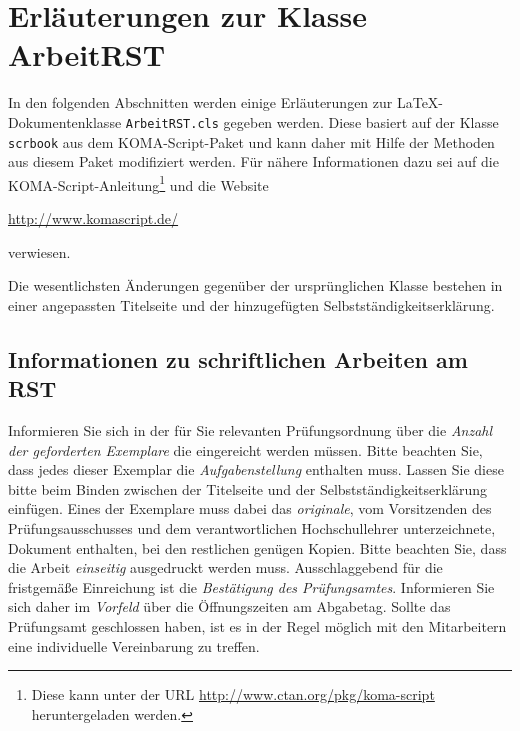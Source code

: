 \chapter{Erläuterungen zur Klasse ArbeitRST}
In den folgenden Abschnitten werden einige Erläuterungen zur \LaTeX-Dokumentenklasse \texttt{ArbeitRST.cls} gegeben werden. Diese basiert auf der Klasse \texttt{scrbook} aus dem KOMA-Script-Paket und kann daher mit Hilfe der Methoden aus diesem Paket modifiziert werden. Für nähere Informationen dazu sei auf die KOMA-Script-Anleitung\footnote{Diese kann unter der URL \url{http://www.ctan.org/pkg/koma-script} heruntergeladen werden.} und die Website
\begin{center}
	\url{http://www.komascript.de/}
\end{center}
verwiesen. 

Die wesentlichsten Änderungen gegenüber der ursprünglichen Klasse bestehen in einer angepassten Titelseite und der hinzugefügten Selbstständigkeitserklärung.
\section{Informationen zu schriftlichen Arbeiten am RST}
Informieren Sie sich in der für Sie relevanten Prüfungsordnung über die \emph{Anzahl der geforderten Exemplare} die eingereicht werden müssen. Bitte beachten Sie, dass jedes dieser Exemplar die \emph{Aufgabenstellung} enthalten muss. Lassen Sie diese bitte beim Binden zwischen der Titelseite und der Selbstständigkeitserklärung einfügen. Eines der Exemplare muss dabei das \emph{originale}, vom Vorsitzenden des Prüfungsausschusses und dem verantwortlichen Hochschullehrer unterzeichnete, Dokument enthalten, bei den restlichen genügen Kopien. Bitte beachten Sie, dass die Arbeit \emph{einseitig} ausgedruckt werden muss. Ausschlaggebend für die fristgemäße Einreichung ist die \emph{Bestätigung des Prüfungsamtes}. Informieren Sie sich daher im \emph{Vorfeld} über die Öffnungszeiten am Abgabetag. Sollte das Prüfungsamt geschlossen haben, ist es in der Regel möglich mit den Mitarbeitern eine individuelle Vereinbarung zu treffen.
